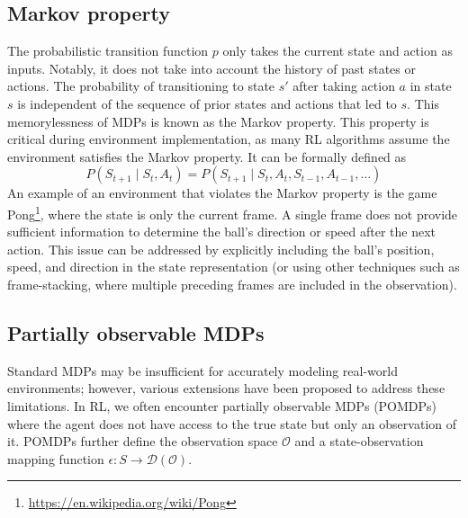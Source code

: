 \documentclass[
  digital,     %
  oneside,     %
  nosansbold,  %
  nocolorbold, %
  lof,         %
  lot,         %
]{fithesis4}
\begin{document}
\subsection{Markov property}
\label{subsec:markov_property}
The probabilistic transition function $p$ only takes the current state and action as inputs. Notably, it does not take into account the history of past states or actions. The probability of transitioning to state $s'$ after taking action $a$ in state $s$ is independent of the sequence of prior states and actions that led to $s$. This memorylessness of MDPs is known as the Markov property. This property is critical during environment implementation, as many RL algorithms assume the environment satisfies the Markov property. It can be formally defined as
\begin{equation}
P(S_{t+1}\mid S_t,A_t)=P(S_{t+1}\mid S_t,A_t,S_{t-1},A_{t-1}, \dotsc)
\end{equation}
An example of an environment that violates the Markov property is the game Pong\footnote{\url{https://en.wikipedia.org/wiki/Pong}}, where the state is only the current frame. A single frame does not provide sufficient information to determine the ball’s direction or speed after the next action. This issue can be addressed by explicitly including the ball’s position, speed, and direction in the state representation (or using other techniques such as frame-stacking, where multiple preceding frames are included in the observation).

\subsection{Partially observable MDPs}
Standard MDPs may be insufficient for accurately modeling real-world environments; however, various extensions have been proposed to address these limitations. In RL, we often encounter partially observable MDPs (POMDPs) where the agent does not have access to the true state but only an observation of it. POMDPs further define the observation space $\mathcal{O}$ and a state-observation mapping function $\epsilon \colon S \to \mathcal{D}(\mathcal{O})$.
\end{document}
